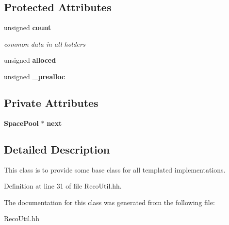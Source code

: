 \subsection*{Protected Attributes}
\begin{DoxyCompactItemize}
\item 
unsigned {\bf count}\label{classSpacePool_ae6b1754e19e2d105a2d3ea870bdca86f}

\begin{DoxyCompactList}\small\item\em common data in all holders \end{DoxyCompactList}\item 
unsigned {\bfseries alloced}\label{classSpacePool_a5acf9c577dd6d872d69c24916026f002}

\item 
unsigned {\bfseries \-\_\-prealloc}\label{classSpacePool_ab88631665439889f3c8981841f6c8ad1}

\end{DoxyCompactItemize}
\subsection*{Private Attributes}
\begin{DoxyCompactItemize}
\item 
{\bf Space\-Pool} $\ast$ {\bfseries next}\label{classSpacePool_acdbefd16991b86ea2397997074193484}

\end{DoxyCompactItemize}


\subsection{Detailed Description}
This class is to provide some base class for all templated implementations. 

Definition at line 31 of file Reco\-Util.\-hh.



The documentation for this class was generated from the following file\-:\begin{DoxyCompactItemize}
\item 
Reco\-Util.\-hh\end{DoxyCompactItemize}
